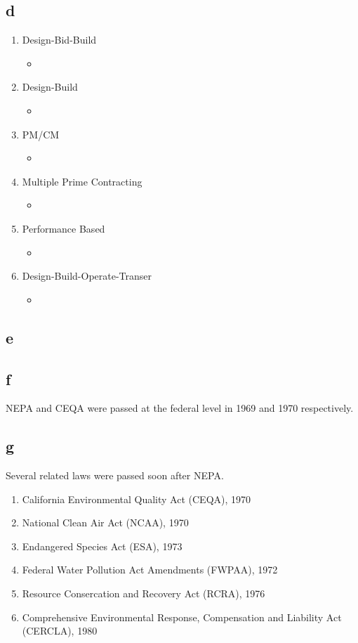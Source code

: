 \documentclass[12pt]{article} %
\begin{document}
	\subsection{d}
		\begin{enumerate}
			\item Design-Bid-Build
				\begin{itemize}
					\item 
				\end{itemize}
			\item Design-Build
				\begin{itemize}
					\item 
				\end{itemize}
			\item PM/CM
				\begin{itemize}
					\item 
				\end{itemize}
			\item Multiple Prime Contracting
				\begin{itemize}
					\item 
				\end{itemize}
			\item Performance Based
				\begin{itemize}
					\item 
				\end{itemize}
			\item Design-Build-Operate-Transer
				\begin{itemize}
					\item 
				\end{itemize}
		\end{enumerate}
		
	\subsection{e}
	
	\subsection{f}
		NEPA and CEQA were passed at the federal level in 1969 and 1970 respectively. 
	
	\subsection{g}
		Several related laws were passed soon after NEPA.
		\begin{enumerate}
			\item California Environmental Quality Act (CEQA), 1970
			\item National Clean Air Act (NCAA), 1970
			\item Endangered Species Act (ESA), 1973
			\item Federal Water Pollution Act Amendments (FWPAA), 1972
			\item Resource Consercation and Recovery Act (RCRA), 1976
			\item Comprehensive Environmental Response, Compensation and Liability Act (CERCLA), 1980
		\end{enumerate}			
	
\end{document}
